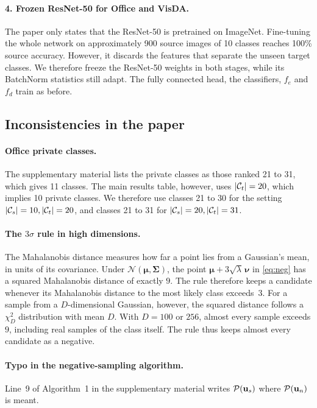 \paragraph{4. Frozen ResNet-50 for Office and VisDA.}
The paper only states that the ResNet-50 is pretrained on ImageNet.
Fine-tuning the whole network on approximately 900 source images of 10 classes reaches 100\% source accuracy.
However, it discards the features that separate the unseen target classes.
We therefore freeze the ResNet-50 weights in both stages, while its BatchNorm statistics still adapt.
The fully connected head, the classifiers, $f_e$ and $f_d$ train as before.

\subsection{Inconsistencies in the paper}\label{sec:inconsistencies}

\paragraph{Office private classes.}
The supplementary material lists the private classes as those ranked 21 to 31, which gives 11 classes.
The main results table, however, uses $|\mathcal{C}_t|=20$, which implies 10 private classes.
We therefore use classes 21 to 30 for the setting $|\mathcal{C}_s|=10, |\mathcal{C}_t|=20$, and classes 21 to 31 for $|\mathcal{C}_s|=20, |\mathcal{C}_t|=31$.

\paragraph{The $3\sigma$ rule in high dimensions.}
The Mahalanobis distance measures how far a point lies from a Gaussian's mean, in units of its covariance.
Under $\mathcal{N}(\bm{\mu},\bm{\Sigma})$, the point $\bm{\mu}+3\sqrt{\lambda}\,\bm{\nu}$ in \eqref{eq:neg} has a squared Mahalanobis distance of exactly $9$.
The rule therefore keeps a candidate whenever its Mahalanobis distance to the most likely class exceeds~$3$.
For a sample from a $D$-dimensional Gaussian, however, the squared distance follows a $\chi^2_D$ distribution with mean $D$.
With $D=100$ or $256$, almost every sample exceeds $9$, including real samples of the class itself.
The rule thus keeps almost every candidate as a negative.

\paragraph{Typo in the negative-sampling algorithm.}
Line~9 of Algorithm~1 in the supplementary material writes $\mathcal{P}(\mathbf{u}_s)$ where $\mathcal{P}(\mathbf{u}_n)$ is meant.

